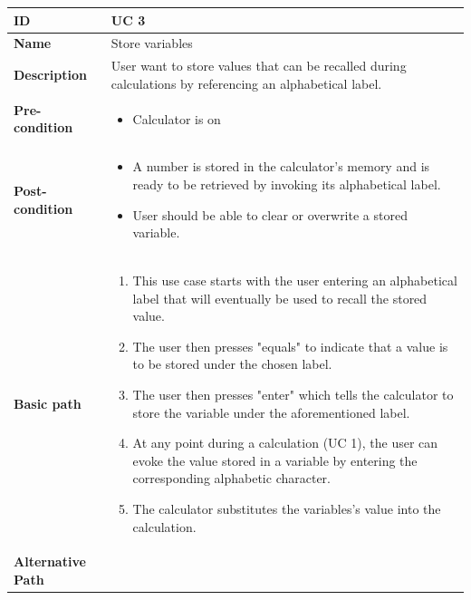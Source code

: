 \documentclass[a4paper, 12pt]{article}
\begin{document}
\begin{table}[!h]
\begin{tabular}{|p{3cm}|p{9cm}|}
\hline
\textbf{ID} & UC 3  \\ \hline
\textbf{Name} & Store variables  \\ \hline
\textbf{Description} & User want to store values that can be recalled during calculations by referencing an alphabetical label.  \\ \hline
\textbf{Pre-condition} &
	\begin{itemize}
		\vspace{-2mm}
		\item Calculator is on
		\vspace{-3.5mm}
	\end{itemize}  \\ \hline
\textbf{Post-condition} &
	\begin{itemize}
		\vspace{-2mm}
		\item A number is stored in the calculator's memory and is ready to be retrieved by invoking its alphabetical label.
		\item User should be able to clear or overwrite a stored variable.
		\vspace{-3.5mm}
	\end{itemize}  \\ \hline
\textbf{Basic path} &
	\begin{enumerate}
		\vspace{-2mm}
		\item This use case starts with the user entering an alphabetical label that will eventually be used to recall the stored value.
		\item The user then presses "equals" to indicate that a value is to be stored under the chosen label.
		\item The user then presses "enter" which tells the calculator to store the variable under the aforementioned label.
		\item At any point during a calculation (UC 1), the user can evoke the value stored in a variable by entering the corresponding alphabetic character.
		\item The calculator substitutes the variables's value into the calculation.
		\vspace{-3.5mm}
	\end{enumerate}  \\ \hline
\textbf{Alternative Path} &
	\begin{itemize}[leftmargin=6mm]
		\vspace{-2mm}

\end{itemize}
\end{tabular}
\end{table}
\end{document}
